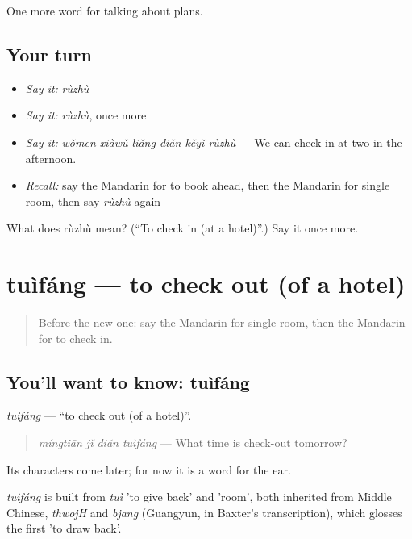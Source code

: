 \begin{grammarlens}[title={What you've built}]
One more word for talking about plans.
\end{grammarlens}

\subsection*{Your turn}
\begin{itemize}
\raggedright
  \item \emph{Say it:} \emph{rùzhù}
  \item \emph{Say it:} \emph{rùzhù}, once more
  \item \emph{Say it:} \emph{wǒmen xiàwǔ liǎng diǎn kěyǐ rùzhù} — We can check in at two in the afternoon.
  \item \emph{Recall:} say the Mandarin for to book ahead, then the Mandarin for single room, then say \emph{rùzhù} again
\end{itemize}

\begin{tcolorbox}[breakable,colback=teal!4,colframe=teal!35!black,title={Before you move on}]
What does rùzhù mean? (\textquotedblleft{}To check in (at a hotel)\textquotedblright{}.) Say it once more.
\end{tcolorbox}
\section[tuìfáng]{tuìfáng — to check out (of a hotel)}

\label{lesson:ZH-C200-tuifang}



\begin{quote}
Before the new one: say the Mandarin for single room, then the Mandarin for to check in.
\end{quote}

\subsection*{You'll want to know: tuìfáng}
\emph{tuìfáng} — \textquotedblleft{}to check out (of a hotel)\textquotedblright{}.

\begin{quote}
\emph{míngtiān jǐ diǎn tuìfáng} — What time is check-out tomorrow?
\end{quote}

Its characters come later; for now it is a word for the ear.

\begin{cousinweb}
\emph{tuìfáng} is built from \emph{tuì} 'to give back' and  'room', both inherited from Middle Chinese, \emph{thwojH} and \emph{bjang} (Guangyun, in Baxter's transcription), which glosses the first 'to draw back'.
\end{cousinweb}

